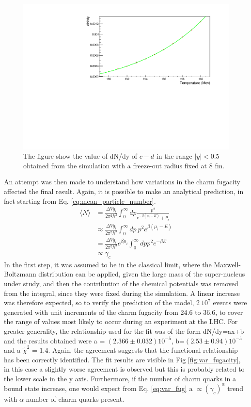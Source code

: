 \documentclass[12pt,a4paper]{book}
\begin{document}
		\begin{figure}
			\centering
		\includegraphics[width=0.8 \linewidth]{pictures/var_temperaure.pdf}
		\caption{The figure show the value of dN/dy of $c-d$ in the range $|y|<0.5$ obtained from the simulation with a freeze-out radius fixed at 8 fm. }
		\label{fig:var_temperature}
	\end{figure}
		An attempt was then made to understand how variations in the charm fugacity affected the final result. Again, it is possible to make an analytical prediction, in fact starting from Eq. \ref{eq:mean_particle_number}.
\begin{equation}
	\begin{aligned}
		\langle N \rangle &= \frac{\Delta V g_i}{2\pi^2\hbar^3} 
		\int_{0}^{\infty} dp 
		\frac{p^2}{e^{-\beta(\mu_i-E)}+\theta_i} \\
		&\approx \frac{\Delta V g_i}{2\pi^2\hbar^3} 
		\int_{0}^{\infty} dp \ p^2 e^{\beta(\mu_i-E)} \\
		&= \frac{\Delta V g_i}{2\pi^2\hbar^3} e^{\beta \mu_i} 
		\int_{0}^{\infty} dp p^2 e^{-\beta E} \\
		&\propto \gamma_c
	\end{aligned}
	\label{eq:var_fug}
\end{equation} 
	In the first step, it was assumed to be in the classical limit, where the Maxwell-Boltzmann distribution can be applied, given the large mass of the super-nucleus under study, and then the contribution of the chemical potentials was removed from the integral, since they were fixed during the simulation. A linear increase was therefore expected, so to verify the prediction of the model, $2 \ 10^7$ events were generated with unit increments of the charm fugacity from 24.6 to 36.6, to cover the range of values most likely to occur during an experiment at the LHC. For greater generality, the relationship used for the fit was of the form dN/dy=ax+b and the results obtained were a = $(2.366 \pm 0.032)10^{-5}$, b=$(2.53 \pm 0.94) 10^{-5}$ and a $\tilde{\chi}^2$ = 1.4. Again, the agreement suggests that the functional relationship has been correctly identified. The fit results are visible in Fig \ref{fig:var_fugacity}, in this case a slightly worse agreement is observed but this is probably related to the lower scale in the y axis. Furthermore, if the number of charm quarks in a bound state increase, one would expect from Eq. \ref{eq:var_fug} a $\propto(\gamma_c)^\alpha$ trend with $\alpha$ number of charm quarks present.
\end{document}
